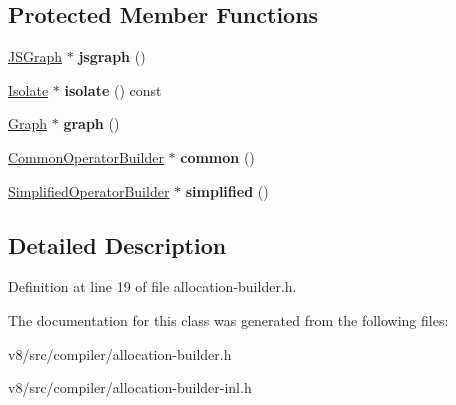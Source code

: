 \subsection*{Protected Member Functions}
\begin{DoxyCompactItemize}
\item 
\mbox{\label{classv8_1_1internal_1_1compiler_1_1AllocationBuilder_ab9389b3e335995149f8f4365c9766abc}} 
\mbox{\hyperlink{classv8_1_1internal_1_1compiler_1_1JSGraph}{J\+S\+Graph}} $\ast$ {\bfseries jsgraph} ()
\item 
\mbox{\label{classv8_1_1internal_1_1compiler_1_1AllocationBuilder_a14b7c2116ab0e552bcf9444493381d43}} 
\mbox{\hyperlink{classv8_1_1internal_1_1Isolate}{Isolate}} $\ast$ {\bfseries isolate} () const
\item 
\mbox{\label{classv8_1_1internal_1_1compiler_1_1AllocationBuilder_a5f16cb5dae0ad17cc690fbbc316e9f9a}} 
\mbox{\hyperlink{classv8_1_1internal_1_1compiler_1_1Graph}{Graph}} $\ast$ {\bfseries graph} ()
\item 
\mbox{\label{classv8_1_1internal_1_1compiler_1_1AllocationBuilder_a169361bf67eb13560d4dcaf1dd5644d1}} 
\mbox{\hyperlink{classv8_1_1internal_1_1compiler_1_1CommonOperatorBuilder}{Common\+Operator\+Builder}} $\ast$ {\bfseries common} ()
\item 
\mbox{\label{classv8_1_1internal_1_1compiler_1_1AllocationBuilder_a117ba4df689ef4ad7b5d6ebb122f4055}} 
\mbox{\hyperlink{classv8_1_1internal_1_1compiler_1_1SimplifiedOperatorBuilder}{Simplified\+Operator\+Builder}} $\ast$ {\bfseries simplified} ()
\end{DoxyCompactItemize}


\subsection{Detailed Description}


Definition at line 19 of file allocation-\/builder.\+h.



The documentation for this class was generated from the following files\+:\begin{DoxyCompactItemize}
\item 
v8/src/compiler/allocation-\/builder.\+h\item 
v8/src/compiler/allocation-\/builder-\/inl.\+h\end{DoxyCompactItemize}
